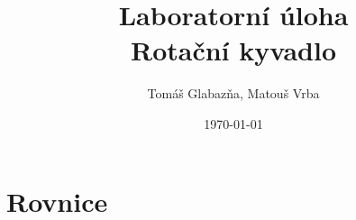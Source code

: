 \documentclass[11pt,a4paper]{article}
\title{%
  Laboratorní úloha \\
  \large Rotační kyvadlo}
\author{Tomáš Glabazňa, Matouš Vrba}
\date{\today}
\begin{document}
\maketitle

\section*{Rovnice}
\end{document}
